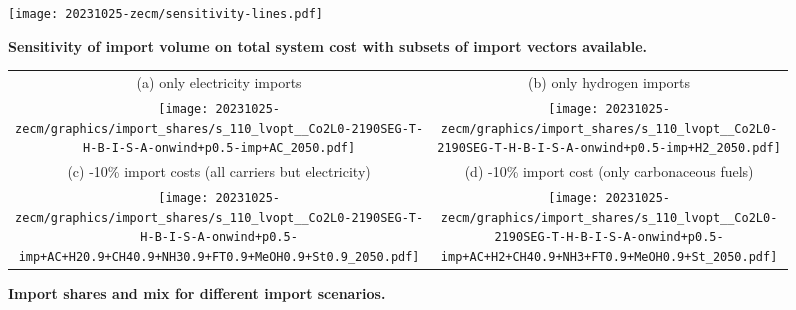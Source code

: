 \begin{figure*}
    \texttt{[image: 20231025-zecm/sensitivity-lines.pdf]}
    \caption{\textbf{Sensitivity of import volume on total system cost with subsets of import vectors available.}}
    \label{fig:si:volume-subsets}
\end{figure*}

\begin{figure*}
    \footnotesize
    \begin{tabular}{cc}
        (a) only electricity imports & (b) only hydrogen imports \\
        \texttt{[image: 20231025-zecm/graphics/import\_shares/s\_110\_lvopt\_\_Co2L0-2190SEG-T-H-B-I-S-A-onwind+p0.5-imp+AC\_2050.pdf]} &
        \texttt{[image: 20231025-zecm/graphics/import\_shares/s\_110\_lvopt\_\_Co2L0-2190SEG-T-H-B-I-S-A-onwind+p0.5-imp+H2\_2050.pdf]} \\
        (c) -10\% import costs (all carriers but electricity) & (d) -10\% import cost (only carbonaceous fuels) \\
        \texttt{[image: 20231025-zecm/graphics/import\_shares/s\_110\_lvopt\_\_Co2L0-2190SEG-T-H-B-I-S-A-onwind+p0.5-imp+AC+H20.9+CH40.9+NH30.9+FT0.9+MeOH0.9+St0.9\_2050.pdf]} &
        \texttt{[image: 20231025-zecm/graphics/import\_shares/s\_110\_lvopt\_\_Co2L0-2190SEG-T-H-B-I-S-A-onwind+p0.5-imp+AC+H2+CH40.9+NH3+FT0.9+MeOH0.9+St\_2050.pdf]} \\
    \end{tabular}
    \caption{\textbf{Import shares and mix for different import scenarios.}}
    \label{fig:si:import-shares}
\end{figure*}


